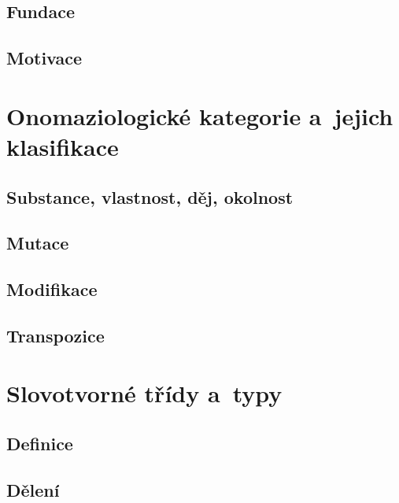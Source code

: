 \hypertarget{fundace}{%
\subsection{Fundace}\label{fundace}}

\hypertarget{motivace}{%
\subsection{Motivace}\label{motivace}}

\hypertarget{onomaziologickuxe9-kategorie-a-jejich-klasifikace}{%
\section{Onomaziologické kategorie a~jejich
klasifikace}\label{onomaziologickuxe9-kategorie-a-jejich-klasifikace}}

\hypertarget{substance-vlastnost-dux11bj-okolnost}{%
\subsection{Substance, vlastnost, děj,
okolnost}\label{substance-vlastnost-dux11bj-okolnost}}

\hypertarget{mutace}{%
\subsection{Mutace}\label{mutace}}

\hypertarget{modifikace}{%
\subsection{Modifikace}\label{modifikace}}

\hypertarget{transpozice}{%
\subsection{Transpozice}\label{transpozice}}

\hypertarget{slovotvornuxe9-tux159uxeddy-a-typy}{%
\section{Slovotvorné třídy
a~typy}\label{slovotvornuxe9-tux159uxeddy-a-typy}}

\hypertarget{definice}{%
\subsection{Definice}\label{definice}}

\hypertarget{dux11blenuxed}{%
\subsection{Dělení}\label{dux11blenuxed}}
